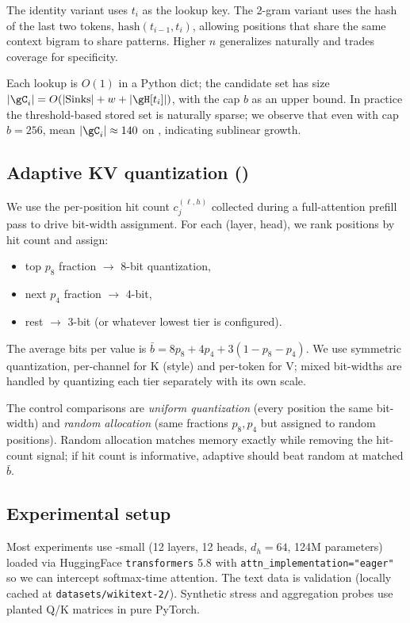  The identity variant uses $t_i$ as the lookup key. The 2-gram variant uses the hash of the last two tokens, $\mathrm{hash}(t_{i-1}, t_i)$, allowing positions that share the same context bigram to share patterns. Higher $n$ generalizes naturally and trades coverage for specificity.

 Each lookup is $O(1)$ in a Python dict; the candidate set has size $|\gC_i| = O(|\mathrm{Sinks}| + w + |\gH[t_i]|)$, with the cap $b$ as an upper bound. In practice the threshold-based stored set is naturally sparse; we observe that even with cap $b = 256$, mean $|\gC_i| \approx 140$ on \wikitext, indicating sublinear growth.

\subsection{Adaptive KV quantization (\hmaquant)}
\label{sec:method:quant}

We use the per-position hit count $c_j^{(\ell, h)}$ collected during a full-attention prefill pass to drive bit-width assignment. For each (layer, head), we rank positions by hit count and assign:
\begin{itemize}[leftmargin=*,itemsep=0pt,topsep=0pt]
    \item top $p_8$ fraction $\to$ 8-bit quantization,
    \item next $p_4$ fraction $\to$ 4-bit,
    \item rest $\to$ 3-bit (or whatever lowest tier is configured).
\end{itemize}
The average bits per value is $\bar{b} = 8 p_8 + 4 p_4 + 3 (1 - p_8 - p_4)$. We use symmetric quantization, per-channel for K (\kivi style) and per-token for V; mixed bit-widths are handled by quantizing each tier separately with its own scale.

The control comparisons are \emph{uniform quantization} (every position the same bit-width) and \emph{random allocation} (same fractions $p_8, p_4$ but assigned to random positions). Random allocation matches memory exactly while removing the hit-count signal; if hit count is informative, adaptive should beat random at matched $\bar{b}$.

\subsection{Experimental setup}
\label{sec:method:setup}

 Most experiments use \gpttwo-small (12 layers, 12 heads, $d_h = 64$, 124M parameters) loaded via HuggingFace \texttt{transformers} 5.8 with \texttt{attn\_implementation="eager"} so we can intercept softmax-time attention. The text data is \wikitext validation (locally cached at \texttt{datasets/wikitext-2/}). Synthetic stress and aggregation probes use planted Q/K matrices in pure PyTorch.

